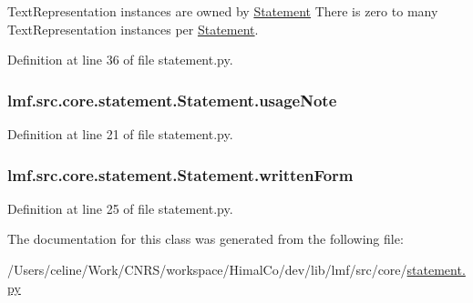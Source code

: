 Text\+Representation instances are owned by \hyperlink{classlmf_1_1src_1_1core_1_1statement_1_1_statement}{Statement} There is zero to many Text\+Representation instances per \hyperlink{classlmf_1_1src_1_1core_1_1statement_1_1_statement}{Statement}. 



Definition at line 36 of file statement.\+py.

\hypertarget{classlmf_1_1src_1_1core_1_1statement_1_1_statement_a2e146c5f5de5eed52c082c2cc0bea7d0}{
\subsubsection[{usage\+Note}]{\setlength{\rightskip}{0pt plus 5cm}lmf.\+src.\+core.\+statement.\+Statement.\+usage\+Note}}\label{classlmf_1_1src_1_1core_1_1statement_1_1_statement_a2e146c5f5de5eed52c082c2cc0bea7d0}


Definition at line 21 of file statement.\+py.

\hypertarget{classlmf_1_1src_1_1core_1_1statement_1_1_statement_a4126cee37a75d852056ae49f45cf6cc3}{
\subsubsection[{written\+Form}]{\setlength{\rightskip}{0pt plus 5cm}lmf.\+src.\+core.\+statement.\+Statement.\+written\+Form}}\label{classlmf_1_1src_1_1core_1_1statement_1_1_statement_a4126cee37a75d852056ae49f45cf6cc3}


Definition at line 25 of file statement.\+py.



The documentation for this class was generated from the following file\+:\begin{DoxyCompactItemize}
\item 
/\+Users/celine/\+Work/\+C\+N\+R\+S/workspace/\+Himal\+Co/dev/lib/lmf/src/core/\hyperlink{statement_8py}{statement.\+py}\end{DoxyCompactItemize}
